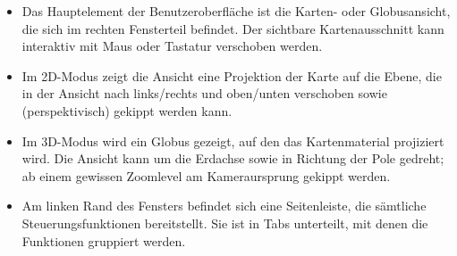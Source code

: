 \documentclass[10pt]{scrreprt}
\begin{document}
\begin{itemize}
	\item Das Hauptelement der Benutzeroberfläche ist die Karten- oder Globusansicht, die sich im rechten Fensterteil befindet. Der sichtbare Kartenausschnitt kann interaktiv mit Maus oder Tastatur verschoben werden.
	\item Im 2D-Modus zeigt die Ansicht eine Projektion der Karte auf die Ebene, die in der Ansicht nach links/rechts und oben/unten verschoben sowie (perspektivisch) gekippt werden kann.
	\item Im 3D-Modus wird ein Globus gezeigt, auf den das Kartenmaterial projiziert wird. Die Ansicht kann um die Erdachse sowie in Richtung der Pole gedreht; ab einem gewissen Zoomlevel am Kameraursprung gekippt werden.
	\item Am linken Rand des Fensters befindet sich eine Seitenleiste, die sämtliche Steuerungsfunktionen bereitstellt. Sie ist in Tabs unterteilt, mit denen die Funktionen gruppiert werden.
\end{itemize}
\end{document}
